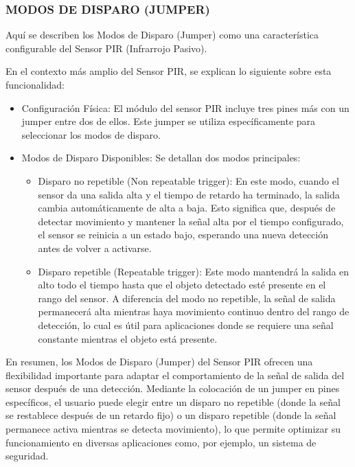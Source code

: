 \documentclass{report}
\begin{document}
\subsubsection{MODOS DE DISPARO (JUMPER)}
Aquí se describen los Modos de Disparo (Jumper) como una característica configurable del Sensor 
PIR (Infrarrojo Pasivo).

En el contexto más amplio del Sensor PIR, se  explican lo siguiente sobre esta funcionalidad:
\begin{itemize}
    \item Configuración Física: El módulo del sensor PIR incluye tres pines más con un jumper entre dos de ellos. Este jumper se utiliza específicamente 
    para seleccionar los modos de disparo.
    \item Modos de Disparo Disponibles: Se detallan dos modos principales:
    \begin{itemize}
        \item Disparo no repetible (Non repeatable trigger): En este modo, cuando el sensor da una salida alta y el tiempo de retardo ha terminado, la 
        salida cambia automáticamente de alta a baja. Esto significa que, después de detectar movimiento y mantener la señal alta por el tiempo configurado, 
        el sensor se reinicia a un estado bajo, esperando una nueva detección antes de volver a activarse.
        \item Disparo repetible (Repeatable trigger): Este modo mantendrá la salida en alto todo el tiempo hasta que el objeto detectado esté presente 
        en el rango del sensor. A diferencia del modo no repetible, la señal de salida permanecerá alta mientras haya movimiento continuo dentro del 
        rango de detección, lo cual es útil para aplicaciones donde se requiere una señal constante mientras el objeto está presente.
    \end{itemize}
\end{itemize}

En resumen, los Modos de Disparo (Jumper) del Sensor PIR ofrecen una flexibilidad importante para adaptar el 
comportamiento de la señal de salida del sensor después de una detección. Mediante la colocación de un jumper en 
pines específicos, el usuario puede elegir entre un disparo no repetible (donde la señal se restablece después de 
un retardo fijo) o un disparo repetible (donde la señal permanece activa mientras se detecta movimiento), lo que 
permite optimizar su funcionamiento en diversas aplicaciones como, por ejemplo, un sistema de seguridad.
\end{document}
